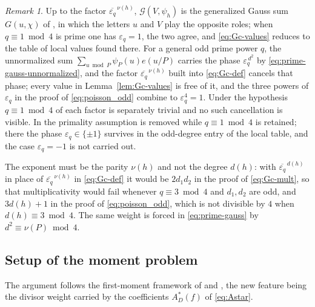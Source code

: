 \documentclass[a4paper,reqno]{amsart}
\numberwithin{equation}{section}
\theoremstyle{remark}
\newtheorem{remark}[theorem]{Remark}
\theoremstyle{definition}
\newcommand{\epsq}{\varepsilon_q}
\newcommand{\Gc}{\mathcal{G}}
\begin{document}
\begin{remark}
Up to the factor $\overline{\epsq}^{\,\nu(h)}$, $\Gc(V,\psi_h)$ is the
generalized Gauss sum $G(u,\chi)$ of \cite[Section~3]{Fl17-1}, in which the
letters $u$ and $V$ play the opposite roles; when $q\equiv1\bmod4$ is prime
one has $\epsq=1$, the two agree, and \eqref{eq:Gc-values} reduces to the
table of local values found there. For a general odd prime power $q$, the
unnormalized sum $\sum_{u\bmod P}\psi_P(u)e(u/P)$ carries the phase
$\epsq^{\,d^2}$ by \eqref{eq:prime-gauss-unnormalized}, and the factor
$\overline{\epsq}^{\,\nu(h)}$ built into \eqref{eq:Gc-def} cancels that
phase; every value in Lemma~\ref{lem:Gc-values} is free of it, and the three
powers of $\epsq$ in the proof of \eqref{eq:poisson_odd} combine to
$\epsq^4=1$. Under the hypothesis $q\equiv1\bmod4$ of \cite{Fl17-1} each
factor is separately trivial and no such cancellation is visible. In
\cite[Section~9]{Fl17-1} the primality assumption is removed while
$q\equiv1\bmod4$ is retained; there the phase $\epsq\in\{\pm1\}$ survives in
the odd-degree entry of the local table, and the case $\epsq=-1$ is not
carried out.

The exponent must be the parity $\nu(h)$ and not the degree $d(h)$: with
$\overline{\epsq}^{\,d(h)}$ in place of $\overline{\epsq}^{\,\nu(h)}$ in
\eqref{eq:Gc-def} it would be $2d_1d_2$ in the proof of \eqref{eq:Gc-mult},
so that multiplicativity would fail whenever $q\equiv3\bmod4$ and $d_1,d_2$
are odd, and $3d(h)+1$ in the proof of \eqref{eq:poisson_odd}, which is not
divisible by $4$ when $d(h)\equiv3\bmod4$. The same weight is forced in
\eqref{eq:prime-gauss} by $d^2\equiv\nu(P)\bmod4$.
\end{remark}

\subsection{Setup of the moment problem}

The argument follows the first-moment framework of
\cite[Section~3]{AM-21} and \cite[Section~3]{Ju20}, the new feature being
the divisor weight carried by the coefficients $A_D^*(f)$ of
\eqref{eq:Astar}.
\end{document}
